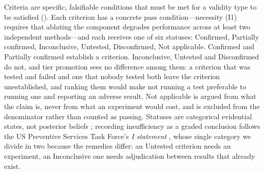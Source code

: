 \documentclass{article}
\begin{document}
Criteria are specific, falsifiable conditions that must be met for a validity type to be satisfied (). Each criterion has a concrete pass condition---necessity (I1) requires that ablating the component degrades performance across at least two independent methods---and each receives one of six statuses: Confirmed, Partially confirmed, Inconclusive, Untested, Disconfirmed, Not applicable. Confirmed and Partially confirmed establish a criterion. Inconclusive, Untested and Disconfirmed do not, and tier promotion sees no difference among them: a criterion that was tested and failed and one that nobody tested both leave the criterion unestablished, and ranking them would make not running a test preferable to running one and reporting an adverse result. Not applicable is argued from what the claim is, never from what an experiment would cost, and is excluded from the denominator rather than counted as passing. Statuses are categorical evidential states, not posterior beliefs \citep{mayo2018statistical}; recording insufficiency as a graded conclusion follows the US Preventive Services Task Force's \emph{I statement} \citep{uspstf2021}, whose single category we divide in two because the remedies differ: an Untested criterion needs an experiment, an Inconclusive one needs adjudication between results that already exist.
\end{document}
